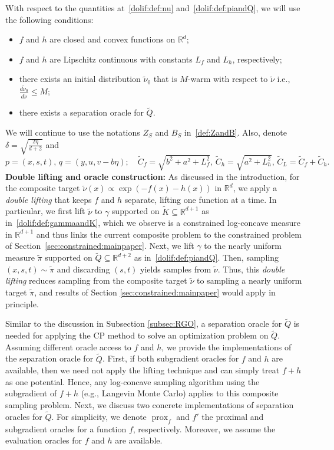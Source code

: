\documentclass[11pt,letterpaper]{article}
\newcommand{\R}{\mathbb{R}}
\newcommand{\K}{\widetilde{K}}
\newcommand{\Q}{\widetilde{Q}}
\newcommand{\prox}{\operatorname{prox}}
\begin{document}
With respect to the quantities at~\eqref{dolif:def:nu} and~\eqref{dolif:def:piandQ}, we will use the following conditions:
\begin{itemize}
\item[(B1)] $f$ and $h$ are closed and convex functions on $\R^d$;

\item[(B2)] $f$ and $h$ are Lipschitz continuous with constants $L_f$ and $L_h$, respectively;

    \item[(B3)] there exists an initial distribution $\tilde{\nu}_0$ that is $M$-warm with respect to $\tilde{\nu}$ i.e., $\frac{d\tilde{\nu}_0}{d \tilde{\nu}}\leq M$;
    
\item[(B4)] there exists a separation oracle for $\Q$.
\end{itemize}

We will continue to use the notations $Z_S$ and $B_S$ in~\eqref{def:ZandB}. Also, denote $\delta = \sqrt{\frac{2\eta}{d+2}}$ and 
\begin{equation}
\label{dolif:def:notation}
    p=(x,s,t), \, q=(y,u,v-b\eta);\quad \widetilde{C}_f=\sqrt{b^2+a^2+L_f^2}, \, \widetilde{C}_h=\sqrt{a^2+L_h^2}, \, \widetilde{C}_L=\widetilde{C}_f+\widetilde{C}_h. 
\end{equation}
\textbf{Double lifting and oracle construction:} As discussed in the introduction, for the composite target $\tilde{\nu}(x)\propto \exp\left(-f(x)-h(x)\right)$ in $\R^d$, we apply a \emph{double lifting} that keeps $f$ and $h$ separate, lifting one function at a time. In particular, we first lift $\tilde{\nu}$ to $\gamma$ supported on $\K\subseteq \R^{d+1}$ as in~\eqref{dolif:def:gammaandK}, which we observe is a constrained log-concave measure in $\R^{d+1}$ and thus links the current composite problem to the constrained problem of Section~\ref{sec:constrained:mainpaper}. Next, we lift $\gamma$ to the nearly uniform  measure $\tilde{\pi}$ supported on $\Q\subseteq \R^{d+2}$ as in~\eqref{dolif:def:piandQ}. Then, sampling $(x,s,t)\sim\tilde{\pi}$ and discarding $(s,t)$ yields samples from $\tilde{\nu}$. Thus, this \emph{double lifting} reduces sampling from the composite target $\tilde{\nu}$ to sampling a nearly uniform target $\tilde{\pi}$, and results of Section \ref{sec:constrained:mainpaper} would apply in principle.

Similar to the discussion in Subsection \ref{subsec:RGO}, a separation oracle for $\Q$ is needed for applying the CP method to solve an optimization problem on $\Q$. Assuming different oracle access to $f$ and $h$, we provide the implementations of the separation oracle for $\Q$. First, if both subgradient oracles for $f$ and $h$ are available, then we need not apply the lifting technique and can simply treat $f+h$ as one potential. Hence, any log-concave sampling algorithm using the subgradient of $f+h$ (e.g., Langevin Monte Carlo) applies to this composite sampling problem. Next, we discuss two concrete implementations of separation oracles for $\Q$.
For simplicity, we denote $\prox_f$ and $f'$ the proximal and subgradient oracles for a function $f$, respectively. Moreover, we assume the evaluation oracles for $f$ and $h$ are available.
\end{document}
